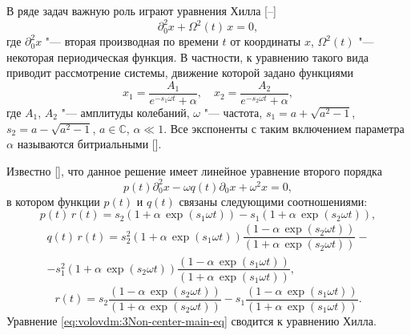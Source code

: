 
\date{17/XII/2014} %



\makerutitle

В ряде задач важную роль играют уравнения Хилла \mbox{[--]}
\[
\partial_{0}^{2}x+\Omega^{2} (t) \, x=0,
\]
где $\partial_{0}^{2}x$ "---  вторая производная по времени $t$ от координаты $x$, 
$\Omega^{2} (t) $ "--- некоторая периодическая функция. 
В частности, к уравнению такого вида приводит рассмотрение системы,
движение которой задано функциями
\[
x_{1}=\frac{A_{1}}{e^{-s_{1}\omega t}+\alpha}, \quad  x_{2}=\frac{A_{2}}{e^{-s_{2}\omega t}+\alpha},
\]
где $A_{1}$, $A_{2}$ "--- амплитуды колебаний, 
$\omega$ "--- частота,
$s_{1}=a+\sqrt{a^{2}-1}$, $ s_{2}=a-\sqrt{a^{2}-1}$, $ a\in\mathbb{C}$,
$\alpha\ll1$. 
Все экспоненты с таким включением параметра $\alpha$ называются битриальными [].


Известно {[]},
 что данное решение имеет линейное уравнение второго порядка
\begin{equation}
p(t)\partial_{0}^{2}x-\omega q(t) \partial_{0}x+\omega^{2}  x=0,\label{eq:volovdm:3Non-center-main-eq}
\end{equation}
в котором функции  $p(t)$ и $q(t)$ связаны следующими соотношениями:
\[
p(t)\, r(t)=s_{2}\left(1+\alpha\,\exp\left(s_{1}\omega t\right)\right)-s_{1}\left(1+\alpha\,\exp\left(s_{2}\omega t\right)\right),
\]
\begin{multline}
q(t)\, r(t)=s_{2}^{2}\left(1+\alpha\,\exp\left(s_{1}\omega t\right)\right)\dfrac{\left(1-\alpha\,\exp\left(s_{2}\omega t\right)\right)}{\left(1+\alpha\,\exp\left(s_{2}\omega t\right)\right)}-
\\
-s_{1}^{2}\left(1+\alpha\,\exp\left(s_{2}\omega t\right)\right)\dfrac{\left(1-\alpha\,\exp\left(s_{1}\omega t\right)\right)}{\left(1+\alpha\,\exp\left(s_{1}\omega t\right)\right)},
\end{multline}
\[
r(t)=s_{2}\dfrac{\left(1-\alpha\,\exp\left(s_{2}\omega t\right)\right)}{\left(1+\alpha\,\exp\left(s_{2}\omega t\right)\right)}-s_{1}\dfrac{\left(1-\alpha\,\exp\left(s_{1}\omega t\right)\right)}{\left(1+\alpha\,\exp\left(s_{1}\omega t\right)\right)}.
\]
Уравнение \eqref{eq:volovdm:3Non-center-main-eq} сводится к уравнению Хилла. 

